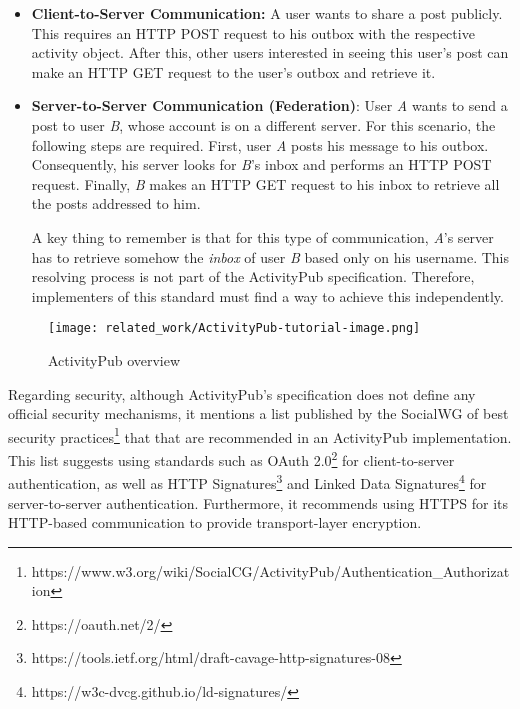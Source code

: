 \begin{itemize}
  \item \textbf{Client-to-Server Communication:} A user wants to share a post publicly. This requires an HTTP POST request to his outbox with the respective activity object. After this, other users interested in seeing this user's post can make an HTTP GET request to the user's outbox and retrieve it.
  \item \textbf{Server-to-Server Communication (Federation)}: User \emph{A} wants to send a post to user \emph{B}, whose account is on a different server. For this scenario, the following steps are required. First, user \emph{A} posts his message to his outbox. Consequently, his server looks for \emph{B}'s inbox and performs an HTTP POST request. Finally, \emph{B} makes an HTTP GET request to his inbox to retrieve all the posts addressed to him.
  
  A key thing to remember is that for this type of communication, \emph{A}'s server has to retrieve somehow the \emph{inbox} of user \emph{B} based only on his username. This resolving process is not part of the ActivityPub specification. Therefore, implementers of this standard must find a way to achieve this independently. 
\end{itemize}
 

\begin{figure}[H]
  \centering
  \texttt{[image: related\_work/ActivityPub-tutorial-image.png]}
  \caption{ActivityPub overview \cite{lemmer-webber_tallon_guy_prodromou_2018}}
  \label{fig:ap_flow}
\end{figure}


Regarding security, although ActivityPub's specification does not define any official security mechanisms, it mentions a list published by the SocialWG of best security practices\footnote{https://www.w3.org/wiki/SocialCG/ActivityPub/Authentication\_Authorization} that that are recommended in an ActivityPub implementation. This list suggests using standards such as OAuth 2.0\footnote{https://oauth.net/2/} for client-to-server authentication, as well as HTTP Signatures\footnote{https://tools.ietf.org/html/draft-cavage-http-signatures-08} and Linked Data Signatures\footnote{https://w3c-dvcg.github.io/ld-signatures/} for server-to-server authentication. Furthermore, it recommends using HTTPS for its HTTP-based communication to provide transport-layer encryption.


